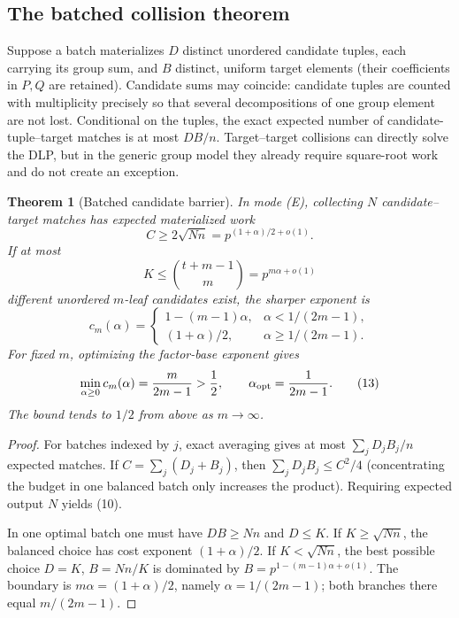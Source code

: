 \documentclass[11pt]{article}
\newtheorem{theorem}{Theorem}[section]
\begin{document}
\subsection{The batched collision theorem}

Suppose a batch materializes $D$ distinct unordered candidate tuples, each
carrying its group sum, and $B$ distinct, uniform target elements (their
coefficients in $P,Q$ are retained).  Candidate sums may coincide: candidate
tuples are counted with multiplicity precisely so that several decompositions
of one group element are not lost.  Conditional on the tuples, the exact
expected number of candidate-tuple--target matches is at most $DB/n$.
Target--target collisions can directly solve the DLP, but in the generic group
model they already require square-root work and do not create an exception.

\begin{theorem}[Batched candidate barrier]\label{thm:batch}
In mode (E), collecting $N$ candidate--target matches has expected materialized
work
\[
 C\ge 2\sqrt{Nn}=p^{(1+\alpha)/2+o(1)}.                              \tag{10}
\]
If at most
\[
 K\le\binom{t+m-1}{m}=p^{m\alpha+o(1)}                              \tag{11}
\]
different unordered $m$-leaf candidates exist, the sharper exponent is
\[
 c_m(\alpha)=
 \begin{cases}
 1-(m-1)\alpha,& \alpha<1/(2m-1),\\[2mm]
 (1+\alpha)/2,& \alpha\ge1/(2m-1).
 \end{cases}                                                        \tag{12}
\]
For fixed $m$, optimizing the factor-base exponent gives
\[
 \min_{\alpha\ge0}c_m(\alpha)=\frac{m}{2m-1}>\frac12,\qquad
 \alpha_{\rm opt}=\frac1{2m-1}.                                   \tag{13}
\]
The bound tends to $1/2$ from above as $m\to\infty$.
\end{theorem}

\begin{proof}
For batches indexed by $j$, exact averaging gives at most
$\sum_jD_jB_j/n$ expected matches.  If
$C=\sum_j(D_j+B_j)$, then
$\sum_jD_jB_j\le C^2/4$ (concentrating the budget in one balanced batch only
increases the product).  Requiring expected output $N$ yields (10).

In one optimal batch one must have $DB\ge Nn$ and $D\le K$.  If
$K\ge\sqrt{Nn}$, the balanced choice has cost exponent $(1+\alpha)/2$.  If
$K<\sqrt{Nn}$, the best possible choice $D=K$, $B=Nn/K$ is dominated by
$B=p^{1-(m-1)\alpha+o(1)}$.  The boundary is
$m\alpha=(1+\alpha)/2$, namely $\alpha=1/(2m-1)$; both branches there equal
$m/(2m-1)$.
\end{proof}
\end{document}
